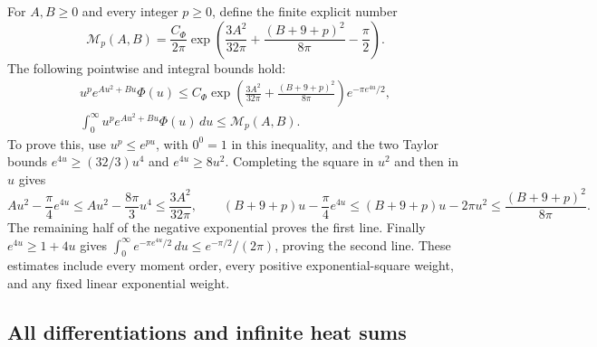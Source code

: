 For $A,B\ge0$ and every integer $p\ge0$, define the finite
explicit number
\begin{equation}\tag{THS4}
 \mathcal M_p(A,B)=\frac{C_\Phi}{2\pi}
 \exp\left(\frac{3A^2}{32\pi}
            +\frac{(B+9+p)^2}{8\pi}-\frac\pi2\right).
\end{equation}
The following pointwise and integral bounds hold:
\begin{equation}\tag{THS5}
\begin{gathered}
 u^p e^{Au^2+Bu}\Phi(u)
 \le C_\Phi\exp\left(\frac{3A^2}{32\pi}
                  +\frac{(B+9+p)^2}{8\pi}\right)
                e^{-\pi e^{4u}/2},\\
 \int_0^\infty u^p e^{Au^2+Bu}\Phi(u)\,du
                  \le\mathcal M_p(A,B).
\end{gathered}
\end{equation}
To prove this, use $u^p\le e^{pu}$, with $0^0=1$ in this
inequality, and the two Taylor bounds
$e^{4u}\ge(32/3)u^4$ and $e^{4u}\ge8u^2$.
Completing the square in $u^2$ and then in $u$ gives
\[
 Au^2-\frac\pi4e^{4u}
       \le Au^2-\frac{8\pi}{3}u^4\le\frac{3A^2}{32\pi},\qquad
 (B+9+p)u-\frac\pi4e^{4u}
       \le(B+9+p)u-2\pi u^2\le\frac{(B+9+p)^2}{8\pi}.
\]
The remaining half of the negative exponential proves the first
line. Finally $e^{4u}\ge1+4u$ gives
$\int_0^\infty e^{-\pi e^{4u}/2}\,du\le e^{-\pi/2}/(2\pi)$,
proving the second line. These estimates include every moment
order, every positive exponential-square weight, and any fixed
linear exponential weight.

\subsection{All differentiations and infinite heat sums}

